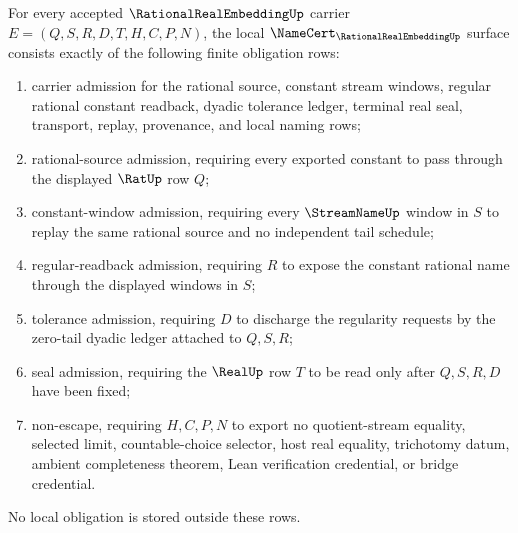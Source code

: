 \begin{theorem}
\label{thm:rational-real-embedding-namecert-obligations}
For every accepted $\RationalRealEmbeddingUp$ carrier $E=(Q,S,R,D,T,H,C,P,N)$, the local $\NameCert_{\RationalRealEmbeddingUp}$ surface consists exactly of the following finite obligation rows:
\begin{enumerate}
\item carrier admission for the rational source, constant stream windows, regular rational constant readback, dyadic tolerance ledger, terminal real seal, transport, replay, provenance, and local naming rows;
\item rational-source admission, requiring every exported constant to pass through the displayed $\RatUp$ row $Q$;
\item constant-window admission, requiring every $\StreamNameUp$ window in $S$ to replay the same rational source and no independent tail schedule;
\item regular-readback admission, requiring $R$ to expose the constant rational name through the displayed windows in $S$;
\item tolerance admission, requiring $D$ to discharge the regularity requests by the zero-tail dyadic ledger attached to $Q,S,R$;
\item seal admission, requiring the $\RealUp$ row $T$ to be read only after $Q,S,R,D$ have been fixed;
\item non-escape, requiring $H,C,P,N$ to export no quotient-stream equality, selected limit, countable-choice selector, host real equality, trichotomy datum, ambient completeness theorem, Lean verification credential, or bridge credential.
\end{enumerate}
No local obligation is stored outside these rows.
\end{theorem}
